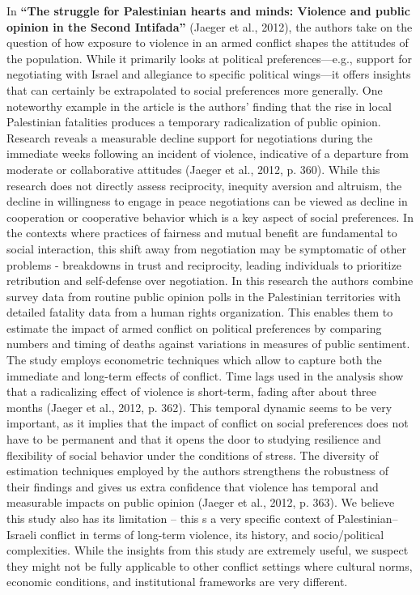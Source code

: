 \documentclass[14pt]{article}
\theoremstyle{remark}
\begin{document}
In \textbf{``The struggle for Palestinian hearts and minds: Violence and public opinion in the Second Intifada''} (Jaeger et al., 2012), the authors take on the question of how exposure to violence in an armed conflict shapes the attitudes of the population. While it primarily looks at political preferences---e.g., support for negotiating with Israel and allegiance to specific political wings---it offers insights that can certainly be extrapolated to social preferences more generally. One noteworthy example in the article is the authors' finding that the rise in local Palestinian fatalities produces a temporary radicalization of public opinion. Research reveals a measurable decline support for negotiations during the immediate weeks following an incident of violence, indicative of a departure from moderate or collaborative attitudes (Jaeger et al., 2012, p. 360). While this research does not directly assess reciprocity, inequity aversion and altruism, the decline in willingness to engage in peace negotiations can be viewed as decline in cooperation or cooperative behavior which is a key aspect of social preferences. In the contexts where practices of fairness and mutual benefit are fundamental to social interaction, this shift away from negotiation may be symptomatic of other problems - breakdowns in trust and reciprocity, leading individuals to prioritize retribution and self-defense over negotiation. In this research the authors combine survey data from routine public opinion polls in the Palestinian territories with detailed fatality data from a human rights organization. This enables them to estimate the impact of armed conflict on political preferences by comparing numbers and timing of deaths against variations in measures of public sentiment. The study employs econometric techniques which allow to capture both the immediate and long-term effects of conflict. Time lags used in the analysis show that a radicalizing effect of violence is short-term, fading after about three months (Jaeger et al., 2012, p. 362). This temporal dynamic seems to be very important, as it implies that the impact of conflict on social preferences does not have to be permanent and that it opens the door to studying resilience and flexibility of social behavior under the conditions of stress. The diversity of estimation techniques employed by the authors strengthens the robustness of their findings and gives us extra confidence that violence has temporal and measurable impacts on public opinion (Jaeger et al., 2012, p. 363). We believe this study also has its limitation -- this s a very specific context of Palestinian--Israeli conflict in terms of long-term violence, its history, and socio/political complexities. While the insights from this study are extremely useful, we suspect they might not be fully applicable to other conflict settings where cultural norms, economic conditions, and institutional frameworks are very different.
\end{document}
